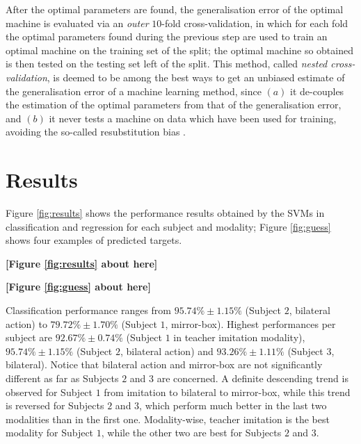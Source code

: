 \documentclass[review,authoryear]{elsarticle}
\renewcommand{\cite}{\citep}
\begin{document}
After the optimal parameters are found, the generalisation error of the optimal machine
is evaluated via an \emph{outer} $10$-fold cross-validation,
in which for each fold the optimal parameters found during the previous step
are used to train an optimal machine on the training set of the split; the optimal
machine so obtained is then tested on the testing set left of the split.
This method, called \emph{nested cross-validation},
is deemed to be among the best ways to get an unbiased estimate of the generalisation
error of a machine learning method, since $(a)$ it de-couples the estimation of the
optimal parameters from that of the generalisation error, and $(b)$ it never tests
a machine on data which have been used for training, avoiding the so-called
resubstitution bias \cite{nestedCV}.

\section{Results}
\label{sec:exp}

Figure \ref{fig:results} shows the performance results obtained by the SVMs
in classification and regression for each subject and modality; Figure
\ref{fig:guess} shows four examples of predicted targets.

\noindent \textbf{[Figure \ref{fig:results} about here]}

\noindent \textbf{[Figure \ref{fig:guess} about here]}

Classification performance ranges from $95.74\% \pm 1.15\%$ (Subject $2$,
bilateral action) to $79.72\% \pm 1.70\%$ (Subject $1$, mirror-box). Highest
performances per subject are $92.67\% \pm 0.74\%$ (Subject $1$ in teacher
imitation modality), $95.74\% \pm 1.15\%$ (Subject $2$, bilateral action)
and $93.26\% \pm 1.11\%$ (Subject $3$, bilateral). Notice that
bilateral action and mirror-box are not significantly different as far as
Subjects $2$ and $3$ are concerned. A definite descending trend is observed
for Subject $1$ from imitation to bilateral to mirror-box, while this trend
is reversed for Subjects $2$ and $3$, which perform much better in the last
two modalities than in the first one. Modality-wise, teacher imitation is
the best modality for Subject $1$, while the other two are best for Subjects
$2$ and $3$.
\end{document}
